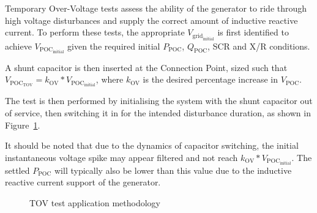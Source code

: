 Temporary Over-Voltage tests assess the ability of the generator to ride through high voltage disturbances and supply the correct amount of inductive reactive current. To perform these tests, the appropriate $V_{\mathrm{grid}_{\mathrm{initial}}}$
is first identified to achieve $V_{\mathrm{POC}_{\mathrm{initial}}}$ given the required initial $P_{\mathrm{POC}}$, $Q_{\mathrm{POC}}$, SCR and X/R conditions. 

A shunt capacitor is then inserted at the Connection Point, sized such that $V_{\mathrm{POC}_{\mathrm{TOV}}} = k_{\mathrm{OV}} * V_{\mathrm{POC}_{\mathrm{initial}}}$, where $k_{\mathrm{OV}}$ is the desired percentage increase in $V_{\mathrm{POC}}$.

The test is then performed by initialising the system with the shunt capacitor out of service, then switching it in for the intended disturbance duration, as shown in Figure~\ref{fig:smib-tov-diagram}.

It should be noted that due to the dynamics of capacitor switching, the initial instantaneous voltage spike may appear filtered and not reach $k_{\mathrm{OV}} * V_{\mathrm{POC}_{\mathrm{initial}}}$. The settled $P_{\mathrm{POC}}$ will typically also be lower than this value due to the inductive reactive current support of the generator.

\begin{figure}[h]
	\centering
	
	\caption{TOV test application methodology}
	\label{fig:smib-tov-diagram}
\end{figure}